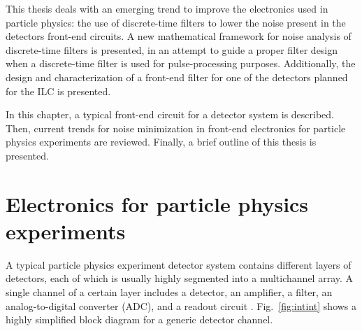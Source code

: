 This thesis deals with an emerging trend to improve the electronics used in particle physics: the use of discrete-time filters to lower the noise present in the detectors front-end circuits. A new mathematical framework for noise analysis of discrete-time filters is presented, in an attempt to guide a proper filter design when a discrete-time filter is used for pulse-processing purposes. Additionally, the design and characterization of a front-end filter for one of the detectors planned for the ILC is presented.






 






In this chapter, a typical front-end circuit for a detector system is described. Then, current trends for noise minimization in front-end electronics for particle physics experiments are reviewed. Finally, a brief outline of this thesis is presented.

\section{Electronics for particle physics experiments}
A typical particle physics experiment detector system contains different layers of detectors, each of which is usually highly segmented into a multichannel array. A single channel of a certain layer includes a detector, an amplifier, a filter, an analog-to-digital converter (ADC), and a readout circuit \citep{spieler2005semiconductor}. Fig.~\ref{fig:intint} shows a highly simplified block diagram for a generic detector channel. 

